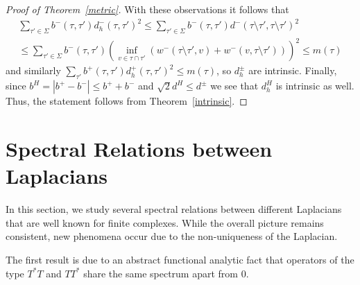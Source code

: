 \documentclass[10pt]{amsart}
\theoremstyle{definition}
\begin{document}
\begin{proof}[Proof of  Theorem~\ref{metric}]
With these observations it follows  that 
\begin{multline*}
	\sum_{\tau'\in \Sigma}b^{-}(\tau,\tau')d^{-}_h(\tau,\tau')^{2}\leq
		\sum_{\tau'\in \Sigma}b^{-}(\tau,\tau')d^{-}(\tau\setminus \tau',\tau\setminus\tau')^{2}
	\\
	 \leq	\sum_{\tau'\in \Sigma}b^{-}(\tau,\tau')\left(\inf_{v\in \tau\cap{\tau'}}\left(w^{-}(\tau\setminus \tau',v) +w^{-}(v,\tau\setminus\tau')\right)\right)^{2}\leq  m(\tau)
\end{multline*}
and similarly
$ \sum_{\tau'}b^{+}(\tau,\tau')d^{+}_h(\tau,\tau')^{2}\leq m(\tau)$, so $d^{\pm}_h$ are intrinsic.
Finally, since $b^{H}=|b^{+}-b^{-}|\leq b^++b^-$ and $\sqrt{2}d^H\leq d^\pm$ we see that $d^{H}_{h}$ is intrinsic as well.
 	Thus, the statement follows from Theorem~\ref{intrinsic}.   
\end{proof}


\section{Spectral Relations between Laplacians}\label{specrel}
In this section, we study several spectral relations between different Laplacians that are well known for finite complexes.
While the overall picture remains consistent,  new phenomena  occur due to the non-uniqueness %
of the Laplacian.


The first result is due to an abstract functional analytic fact that operators of the type $T^{*}T$ and $TT^{*}$ share the same spectrum apart from $0$.
\end{document}
